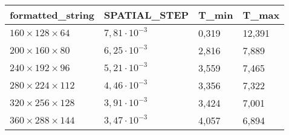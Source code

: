\begin{tabular}{llll}
\toprule
formatted_string & SPATIAL_STEP & T_min & T_max \\
\midrule
$160 \times 128 \times 64$  & $7,81 \cdot  10^{-3}$ & 0,319 & 12,391 \\
$200 \times 160 \times 80$  & $6,25 \cdot  10^{-3}$ & 2,816 & 7,889 \\
$240 \times 192 \times 96$  & $5,21 \cdot  10^{-3}$ & 3,559 & 7,465 \\
$280 \times 224 \times 112$  & $4,46 \cdot  10^{-3}$ & 3,356 & 7,322 \\
$320 \times 256 \times 128$  & $3,91 \cdot  10^{-3}$ & 3,424 & 7,001 \\
$360 \times 288 \times 144$  & $3,47 \cdot  10^{-3}$ & 4,057 & 6,894 \\
\bottomrule
\end{tabular}
